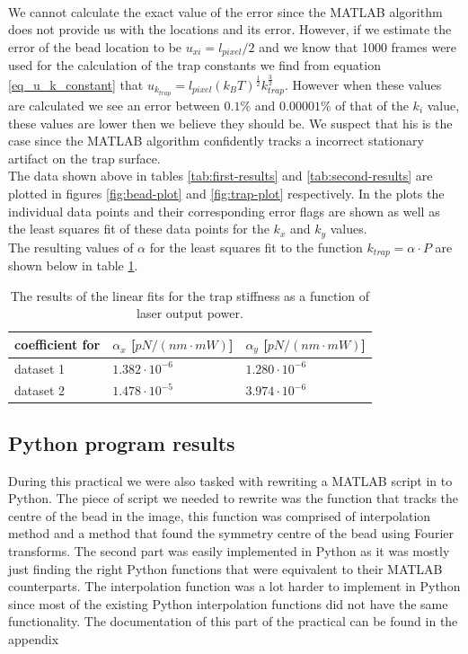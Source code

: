 \\
We cannot calculate the exact value of the error since the MATLAB algorithm does not provide us with the locations and its error. However, if we estimate the error of the bead location to be $u_{xi} = l_{pixel}/2$ and we know that 1000 frames were used for the calculation of the trap constants we find from equation \ref{eq_u_k_constant} that $u_{k_{trap}} = l_{pixel} (k_B T)^{\frac{1}{2}}  k_{trap} ^{\frac{3}{2}}$. However when these values are calculated we see an error between $0.1\%$ and $0.00001\%$ of that of the $k_{i}$ value, these values are lower then we believe they should be. We suspect that his is the case since the MATLAB algorithm confidently tracks a incorrect stationary artifact on the trap surface.\\

The data shown above in tables \ref{tab:first-results} and \ref{tab:second-results} are plotted in figures \ref{fig:bead-plot} and \ref{fig:trap-plot} re\-spectively. In the plots the in\-divi\-dual data points and their cor\-responding error flags are shown as well as the least squares fit of these data points for the $k_x$ and $k_y$ values.\\
The resulting values of $\alpha$ for the least squares fit to the function $k_{trap}= \alpha \cdot P$  are shown below in table \ref{tab:fit-results}.\\

\vspace{-0.5cm}
\begin{table}[h!]
    \centering
    \begin{tabular}{|l|l|l|}
        \hline
        coefficient for & $\alpha_x$ {[}$pN/(nm\cdot mW)${]} & $\alpha_y$ {[}$pN/(nm \cdot mW)${]}\\ \hline
        dataset 1       & $1.382\cdot 10^{-6}$          & $1.280 \cdot 10^{-6}$\\ \hline
        dataset 2       & $1.478 \cdot 10^{-5}$         & $3.974 \cdot 10^{-6}$\\ \hline
    \end{tabular}
    \caption{The results of the linear fits for the trap stiffness as a function of laser output power.}
    \label{tab:fit-results}
\end{table}

\clearpage{}
\subsection{Python program results}
During this practical we were also tasked with rewriting a MATLAB script in to Python. The piece of script we needed to rewrite was the function that tracks the centre of the bead in the image, this function was comprised of interpolation method and a method that found the symmetry centre of the bead using Fourier transforms. The second part was easily implemented in Python as it was mostly just finding the right Python functions that were equivalent to their MATLAB counterparts. The interpolation function was a lot harder to implement in Python since most of the existing Python interpolation functions did not have the same functionality. The documentation of this part of the practical can be found in the appendix\\

